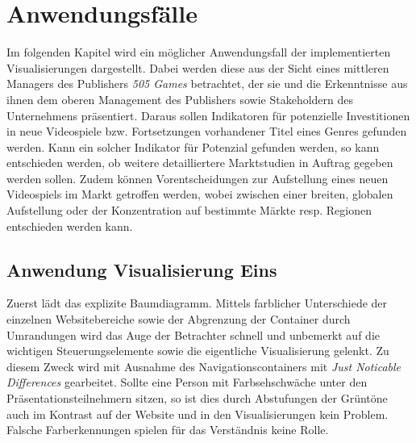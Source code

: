 \documentclass[usegeometry=true]{scrartcl}
\begin{document}
\section{Anwendungsfälle}
Im folgenden Kapitel wird ein möglicher Anwendungsfall der implementierten Visualisierungen dargestellt.
Dabei werden diese aus der Sicht eines mittleren Managers des Publishers \textit{505 Games} betrachtet, der sie und die Erkenntnisse aus ihnen dem oberen Management des Publishers sowie Stakeholdern des Unternehmens präsentiert. 
Daraus sollen Indikatoren für potenzielle Investitionen in neue Videospiele bzw. Fortsetzungen vorhandener Titel eines Genres gefunden werden. 
Kann ein solcher Indikator für Potenzial gefunden werden, so kann entschieden werden, ob weitere detailliertere Marktstudien in Auftrag gegeben werden sollen. 
Zudem können Vorentscheidungen zur Aufstellung eines neuen Videospiels im Markt getroffen werden, wobei zwischen einer breiten, globalen Aufstellung oder der Konzentration auf bestimmte Märkte resp. Regionen entschieden werden kann.

\subsection{Anwendung Visualisierung Eins}
Zuerst lädt das explizite Baumdiagramm. 
Mittels farblicher Unterschiede der einzelnen Websitebereiche sowie der Abgrenzung der Container durch Umrandungen wird das Auge der Betrachter schnell und unbemerkt auf die wichtigen Steuerungselemente sowie die eigentliche Visualisierung gelenkt.
Zu diesem Zweck wird mit Ausnahme des Navigationscontainers mit \textit{Just Noticable Differences} gearbeitet.
Sollte eine Person mit Farbsehschwäche unter den Präsentationsteilnehmern sitzen, so ist dies durch Abstufungen der Grüntöne auch im Kontrast auf der Website und in den Visualisierungen kein Problem. 
Falsche Farberkennungen spielen für das Verständnis keine Rolle.
\end{document}
